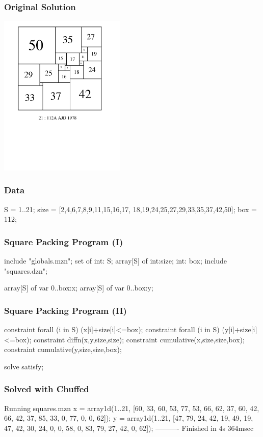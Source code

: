 \begin{frame}
  \frametitle{Original Solution}
  \includegraphics[width=6cm]{spsso21}
\end{frame}


\begin{frame}[fragile]
  \frametitle{Data}
  \begin{semiverbatim}
S = 1..21;
size =  [2,4,6,7,8,9,11,15,16,17,
         18,19,24,25,27,29,33,35,37,42,50];
box = 112;
  \end{semiverbatim}
\end{frame}

\begin{frame}[fragile]
  \frametitle{Square Packing Program (I)}
  \begin{semiverbatim}
include "globals.mzn";
set of int: S;
array[S] of int:size;
int: box;
include "squares.dzn";

array[S] of var 0..box:x;
array[S] of var 0..box:y;
  \end{semiverbatim}
\end{frame}

\begin{frame}[fragile]
  \frametitle{Square Packing Program (II)}
  \begin{semiverbatim}
constraint forall (i in S)
    (x[i]+size[i]<=box);
constraint forall (i in S)
    (y[i]+size[i]<=box);
constraint diffn(x,y,size,size);
constraint cumulative(x,size,size,box);
constraint cumulative(y,size,size,box);

solve satisfy;
  \end{semiverbatim}
\end{frame}

\begin{frame}[fragile]
  \frametitle{Solved with Chuffed}
  \begin{semiverbatim}
Running squares.mzn
x = array1d(1..21, [60, 33, 60, 53, 77, 53, 66, 62,
  37, 60, 42, 66, 42, 37, 85, 33, 0, 77, 0, 0, 62]);
y = array1d(1..21, [47, 79, 24, 42, 19, 49, 19, 47,
  42, 30, 24, 0, 0, 58, 0, 83, 79, 27, 42, 0, 62]);
----------
Finished in 4s 364msec

  \end{semiverbatim}
\end{frame}



